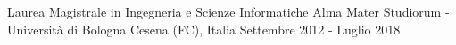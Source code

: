 

\begin{cventries}

  \cventry
    {Laurea Magistrale in Ingegneria e Scienze Informatiche} %
    {Alma Mater Studiorum - Università di Bologna} %
    {Cesena (FC), Italia} %
    {Settembre 2012 - Luglio 2018} %
    {}


%




\end{cventries}
